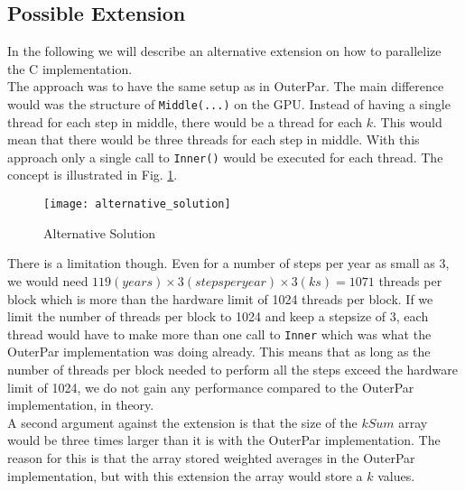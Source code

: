 \subsection{Possible Extension}
In the following we will describe an alternative extension on how to parallelize the C implementation. \\

The approach was to have the same setup as in OuterPar. The main difference would was the structure of \texttt{Middle(...)} on the GPU. Instead of having a single thread for each step in middle, there would be a thread for each $k$. This would mean that there would be three threads for each step in middle. With this approach only a single call to \texttt{Inner()} would be executed for each thread. The concept is illustrated in Fig. \ref{fig:alternative}.

\begin{figure}[ht!]
  \centering
    \texttt{[image: alternative\_solution]}
  \caption{Alternative Solution}
  \label{fig:alternative}
\end{figure}

There is a limitation though. Even for a number of steps per year as small as 3, we would need $119(years) \times 3(steps per year) \times 3(ks) = 1071$ threads per block which is more than the hardware limit of 1024 threads per block. If we limit the number of threads per block to 1024 and keep a stepsize of 3, each thread would have to make more than one call to \texttt{Inner} which was what the OuterPar implementation was doing already. This means that as long as the number of threads per block needed to perform all the steps exceed the hardware limit of 1024, we do not gain any performance compared to the OuterPar implementation, in theory. \\

A second argument against the extension is that the size of the $kSum$ array would be three times larger than it is with the OuterPar implementation. The reason for this is that the array stored weighted averages in the OuterPar implementation, but with this extension the array would store a $k$ values. \\


